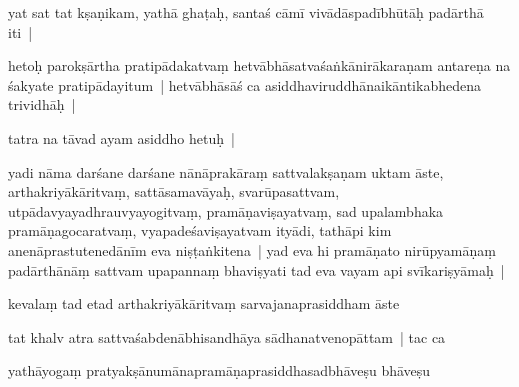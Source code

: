 \documentclass[article,12pt,a4paper]{memoir}%
\newcounter{parCount}
\begin{document}
	  
	  \pstart \leavevmode%
	\label{thakur75-67.6}yat sat tat kṣaṇikam, yathā ghaṭaḥ, santaś cāmī vivādāspadībhūtāḥ padārthā iti |
	{}
	\pend%
      

	  
	  \pstart \leavevmode%
	\label{thakur75-67.8}hetoḥ parokṣārtha pratipādakatvaṃ hetvābhāsatvaśaṅkānirākaraṇam antareṇa na śakyate pratipādayitum | hetvābhāsāś ca asiddhaviruddhānaikāntikabhedena trividhāḥ |
	{}
	\pend%
      

	  
	  \pstart \leavevmode%
	\label{thakur75-67.11}tatra na tāvad ayam asiddho hetuḥ |
	{}
	\pend%
      

	  
	  \pstart \leavevmode%
	\label{thakur75-67.12}yadi nāma darśane darśane nānāprakāraṃ sattvalakṣaṇam uktam āste, arthakriyākāritvaṃ, sattāsamavāyaḥ, svarūpasattvam, utpādavyayadhrauvyayogitvaṃ, pramāṇaviṣayatvaṃ, sad upalambhaka pramāṇagocaratvaṃ, vyapadeśaviṣayatvam ityādi, tathāpi kim anenāprastutenedānīm eva niṣṭaṅkitena | yad eva hi pramāṇato nirūpyamāṇaṃ padārthānāṃ sattvam upapannaṃ bhaviṣyati tad eva vayam api svīkariṣyāmaḥ | 
	{}
	\pend%
      

	  
	  \pstart \leavevmode%
	\label{thakur75-67.15}kevalaṃ tad etad arthakriyākāritvaṃ sarvajanaprasiddham āste
	{}
	\pend%
      

	  
	  \pstart \leavevmode%
	tat khalv atra sattvaśabdenābhisandhāya sādhanatvenopāttam | tac ca
	{}
	\pend%
      

	  
	  \pstart \leavevmode%
	yathāyogaṃ pratyakṣānumānapramāṇaprasiddhasadbhāveṣu bhāveṣu
	{}
	\pend%
      
\end{document}
